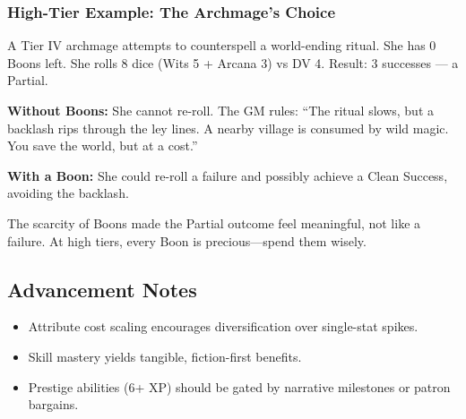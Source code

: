 \subsubsection{High-Tier Example: The Archmage's Choice}

A Tier IV archmage attempts to counterspell a world-ending ritual. She has 0 Boons left. She rolls 8 dice (Wits 5 + Arcana 3) vs DV 4. Result: 3 successes --- a Partial.

\textbf{Without Boons:} She cannot re-roll. The GM rules: ``The ritual slows, but a backlash rips through the ley lines. A nearby village is consumed by wild magic. You save the world, but at a cost.''

\textbf{With a Boon:} She could re-roll a failure and possibly achieve a Clean Success, avoiding the backlash.

The scarcity of Boons made the Partial outcome feel meaningful, not like a failure. At high tiers, every Boon is precious---spend them wisely.

\subsection{Advancement Notes}

\begin{itemize}
  \item Attribute cost scaling encourages diversification over single-stat spikes.
  \item Skill mastery yields tangible, fiction-first benefits.
  \item Prestige abilities (6+ XP) should be gated by narrative milestones or patron bargains.
\end{itemize}